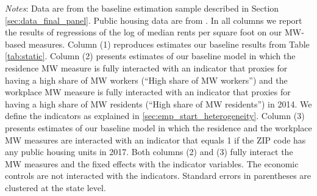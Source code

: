 \begin{table}[hbt!]
    \begin{minipage}{.95\textwidth} \footnotesize
        \vspace{2mm}
        \textit{Notes}: 
        Data are from the baseline estimation sample described in Section 
        \ref{sec:data_final_panel}.
        Public housing data are from \textcite{hudHousing}.
        In all columns we report the results of regressions of the log of median rents 
        per square foot on our MW-based measures.
        Column (1) reproduces estimates our baseline results from Table \ref{tab:static}.
        Column (2) presents estimates of our baseline model in which the residence MW 
        measure is fully interacted with an indicator that proxies for having a high share 
        of MW workers (``High share of MW workers'') and the workplace MW measure is 
        fully interacted with an indicator that proxies for having a high share of MW 
        residents (``High share of MW residents'') in 2014.
        We define the indicators as explained in \ref{sec:emp_start_heterogeneity}.
        Column (3) presents estimates of our baseline model in which the residence and 
        the workplace MW measures are interacted with an indicator that equals 1 if 
        the ZIP code has any public housing units in 2017.
        Both columns (2) and (3) fully interact the MW measures and the fixed effects
        with the indicator variables. The economic controls are not interacted with 
        the indicators.
        Standard errors in parentheses are clustered at the state level.
    \end{minipage}
\end{table}
